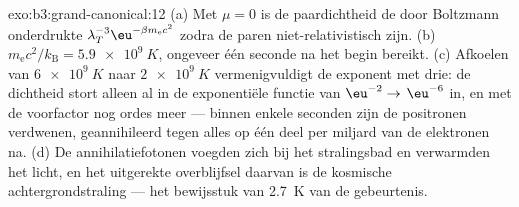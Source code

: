 \begin{solution}{exo:b3:grand-canonical:12}
(a) Met $\mu = 0$ is de paardichtheid de door Boltzmann onderdrukte
$\lambda_T^{-3}\eu^{-\beta m_{\text{e}}c^2}$ zodra de paren
niet-relativistisch zijn. (b) $m_{\text{e}}c^2/k_{\text{B}} =
\qty{5.9e9}{K}$, ongeveer één seconde na het begin bereikt.
(c) Afkoelen van $\qty{6e9}{K}$ naar $\qty{2e9}{K}$ vermenigvuldigt de
exponent met drie: de dichtheid stort alleen al in de exponentiële functie
van $\eu^{-2} \to$ $\eu^{-6}$ in, en met de voorfactor nog ordes meer ---
binnen enkele seconden zijn de positronen verdwenen, geannihileerd tegen
alles op één deel per miljard van de elektronen na. (d) De
annihilatiefotonen voegden zich bij het stralingsbad en verwarmden het
licht, en het uitgerekte overblijfsel daarvan is de kosmische
achtergrondstraling --- het bewijsstuk van \qty{2.7}{K} van de gebeurtenis.
\end{solution}

